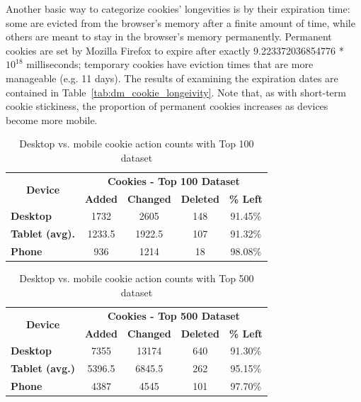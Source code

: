 \documentclass{acm_proc_article-sp}
\begin{document}
Another basic way to categorize cookies' longevities is by their expiration time: some are evicted from the browser's memory after a finite amount of time, while others are meant to stay in the browser's memory permanently. Permanent cookies are set by Mozilla Firefox to expire after exactly 9.223372036854776 * $10^{18}$ milliseconds; temporary cookies have eviction times that are more manageable (e.g. 11 days). The results of examining the expiration dates are contained in Table~\ref{tab:dm_cookie_longeivity}. Note that, as with short-term cookie stickiness, the proportion of permanent cookies increases as devices become more mobile.


\begin{table}[h]
  \centering
  \caption{Desktop vs. mobile cookie action counts with Top 100 dataset}
    \begin{tabular}{|c|c|c|c|c|}
    \hline
    \multicolumn{1}{|c|}{\multirow{2}[4]{*}{\textbf{Device}}} & \multicolumn{4}{|c|}{\textbf{Cookies - Top 100 Dataset}} \\ \cline{2-5}
    \multicolumn{1}{|c|}{} & \multicolumn{1}{|c|}{\textbf{Added}} & \multicolumn{1}{|c|}{\textbf{Changed}} & \multicolumn{1}{|c|}{\textbf{Deleted}} & \multicolumn{1}{|c|}{\textbf{\% Left}}\\ \hline
    \multicolumn{1}{|l|}{\textbf{Desktop}} & 1732   & 2605  & 148 & 91.45\% \\
    \multicolumn{1}{|l|}{\textbf{Tablet (avg).}} & 1233.5  & 1922.5  & 107 & 91.32\%\\
    \multicolumn{1}{|l|}{\textbf{Phone}} & 936   & 1214  & 18 & 98.08\% \\ \hline
    \end{tabular}%
  \label{tab:dm_cookie_counts_100}%
\end{table}%

\begin{table}[h]
  \centering
  \caption{Desktop vs. mobile cookie action counts with Top 500 dataset}
    \begin{tabular}{|c|c|c|c|c|}
    \hline
    \multicolumn{1}{|c|}{\multirow{2}[4]{*}{\textbf{Device}}} & \multicolumn{4}{|c|}{\textbf{Cookies - Top 500 Dataset}} \\ \cline{2-5}
    \multicolumn{1}{|c|}{} & \multicolumn{1}{|c|}{\textbf{Added}} & \multicolumn{1}{|c|}{\textbf{Changed}} & \multicolumn{1}{|c|}{\textbf{Deleted}} & \multicolumn{1}{|c|}{\textbf{\% Left}}\\ \hline
\multicolumn{1}{|l|}{\textbf{Desktop}} & 7355  & 13174  & 640 & 91.30\%\\
    \multicolumn{1}{|l|}{\textbf{Tablet (avg.)}} & 5396.5  & 6845.5  & 262 & 95.15\%\\
    \multicolumn{1}{|l|}{\textbf{Phone}} & 4387  & 4545  & 101 & 97.70\%\\ \hline
    \end{tabular}%
  \label{tab:dm_cookie_counts_500}%
\end{table}%
\end{document}
